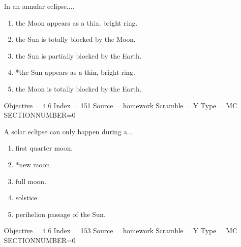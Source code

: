 \documentclass[11pt]{article}
\begin{document}
\begin{enumerate}
\begin{minipage}{\textwidth}
\begin{minipage}{\textwidth}
\item In an annular eclipse,...
\begin{enumerate} 
\setlength{\itemsep}{1pt} 
\setlength{\parskip}{0pt} 
\setlength{\parsep}{0pt}
\setlength{\multicolsep}{1pt} 
\item the Moon appears as a thin, bright ring.
\item the Sun is totally blocked by the Moon.
\item the Sun is partially blocked by the Earth.
\item *the Sun appears as a thin, bright ring.
\item the Moon is totally blocked by the Earth.
\end{enumerate} 
Objective = 4.6
Index = 151
Source = homework
Scramble = Y
Type = MC
SECTIONNUMBER=0
\end{minipage}
\end{minipage}
\vskip 0.20in

\begin{minipage}{\textwidth}
\begin{minipage}{\textwidth}
\item A solar eclipse can only happen during a...
\begin{multicols}{2}
\begin{enumerate} 
\setlength{\itemsep}{1pt} 
\setlength{\parskip}{0pt} 
\setlength{\parsep}{0pt}
\setlength{\multicolsep}{1pt} 
\item first quarter moon.
\item *new moon.
\item full moon.
\item solstice.
\item perihelion passage of the Sun.
\end{enumerate} 
\vfill 
\end{multicols}

Objective = 4.6
Index = 153
Source = homework
Scramble = Y
Type = MC
SECTIONNUMBER=0
\end{minipage}
\end{minipage}
\vskip 0.20in


\end{enumerate}
\end{document}
